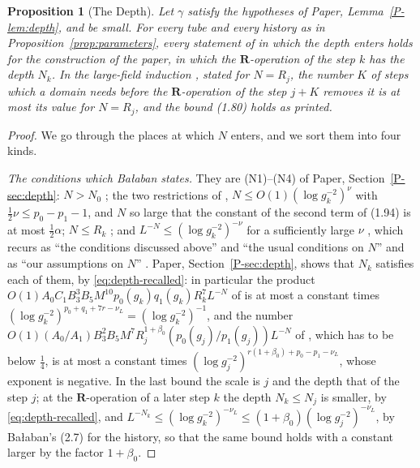 \documentclass[11pt]{preprint}
\numberwithin{equation}{section}
\newtheorem{proposition}{Proposition}
\theoremstyle{definition}
\theoremstyle{remark}
\theoremstyle{plain}
\begin{document}
\begin{proposition}[The Depth]\label{prop:depth}
Let $\gamma$ satisfy the hypotheses of Paper, Lemma~\ref{P-lem:depth}, and be small. For every tube and every history as in Proposition~\ref{prop:parameters}, every statement of \cite{BalabanLFR1,BalabanLFR2} in which the depth enters holds for the construction of the paper, in which the $\mathbf R$-operation of the step $k$ has the depth $N_k$. In the large-field induction \cite[(1.80), pp.~384--387]{BalabanLFR2}, stated for $N = R_j$, the number $K$ of steps which a domain needs before the $\mathbf R$-operation of the step $j + K$ removes it is at most its value for $N = R_j$, and the bound (1.80) holds as printed.
\end{proposition}

\begin{proof}
We go through the places at which $N$ enters, and we sort them into four kinds.

\emph{The conditions which Ba{\l}aban states.} They are (N1)--(N4) of Paper, Section~\ref{P-sec:depth}: $N > N_0$ \cite[p.~179]{BalabanLFR1}; the two restrictions of \cite[(1.94), p.~198]{BalabanLFR1}, $N \leq O(1)(\log g_k^{-2})^\nu$ with $\frac12\nu \leq p_0 - p_1 - 1$, and $N$ so large that the constant of the second term of (1.94) is at most $\frac12\alpha$; $N \leq R_k$ \cite[p.~361]{BalabanLFR2}; and $L^{-N} \leq (\log g_k^{-2})^{-\nu}$ for a sufficiently large $\nu$ \cite[p.~363]{BalabanLFR2}, which recurs as ``the conditions discussed above'' and ``the usual conditions on $N$'' \cite[p.~364, (1.47), p.~368]{BalabanLFR2} and as ``our assumptions on $N$'' \cite[p.~382]{BalabanLFR2}. Paper, Section~\ref{P-sec:depth}, shows that $N_k$ satisfies each of them, by \eqref{eq:depth-recalled}: in particular the product $O(1)A_0C_1B_3^3B_5M^{10}p_0(g_k)q_1(g_k)R_k^7L^{-N}$ of \cite[(1.47)]{BalabanLFR2} is at most a constant times $(\log g_k^{-2})^{p_0+q_1+7r-\nu_L} = (\log g_k^{-2})^{-1}$, and the number $O(1)(A_0/A_1)B_3^2B_5M^7R_j^{1+\beta_0}(p_0(g_j)/p_1(g_j))L^{-N}$ of \cite[p.~382]{BalabanLFR2}, which has to be below $\frac14$, is at most a constant times $(\log g_j^{-2})^{r(1+\beta_0)+p_0-p_1-\nu_L}$, whose exponent is negative. In the last bound the scale is $j$ and the depth that of the step $j$; at the $\mathbf R$-operation of a later step $k$ the depth $N_k \leq N_j$ is smaller, by \eqref{eq:depth-recalled}, and $L^{-N_k} \leq (\log g_k^{-2})^{-\nu_L} \leq (1 + \beta_0)(\log g_j^{-2})^{-\nu_L}$, by Ba{\l}aban's (2.7) for the history, so that the same bound holds with a constant larger by the factor $1 + \beta_0$.


\end{proof}
\end{document}

